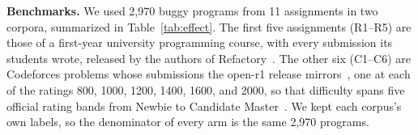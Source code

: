 \documentclass[acmsmall,screen,review,anonymous,nonacm]{acmart}
\begin{document}
\textbf{Benchmarks.} We used 2{,}970 buggy programs from 11 assignments in two corpora, summarized in Table~\ref{tab:effect}. The first five assignments (R1--R5) are those of a first-year university programming course, with every submission its students wrote, released by the authors of Refactory~\cite{hu2019re}. The other six (C1--C6) are Codeforces problems whose submissions the open-r1 release mirrors~\cite{penedo2025codeforces}, one at each of the ratings 800, 1000, 1200, 1400, 1600, and 2000, so that difficulty spans five official rating bands from Newbie to Candidate Master~\cite{cfratings}. We kept each corpus's own labels, so the denominator of every arm is the same 2{,}970 programs.
\end{document}
